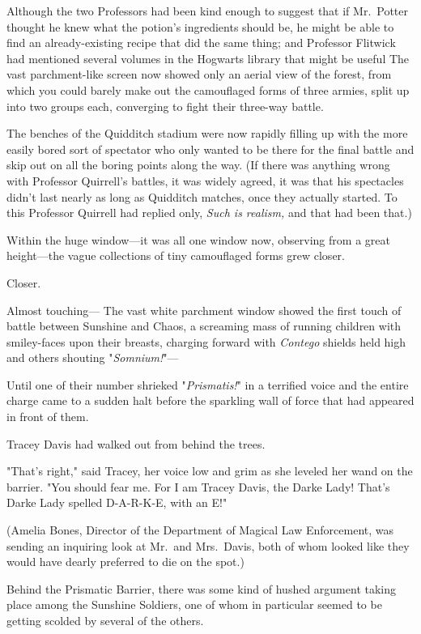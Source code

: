 Although the two Professors had been kind enough to suggest that if Mr.~Potter
thought he knew what the potion's ingredients should be, he might be able to
find an already-existing recipe that did the same thing; and Professor Flitwick
had mentioned several volumes in the Hogwarts library that might be
useful{\el}
\sbreak
The vast parchment-like screen now showed only an aerial view of the forest,
from which you could barely make out the camouflaged forms of three armies,
split up into two groups each, converging to fight their three-way battle.

The benches of the Quidditch stadium were now rapidly filling up with the more
easily bored sort of spectator who only wanted to be there for the final battle
and skip out on all the boring points along the way. (If there was anything
wrong with Professor Quirrell's battles, it was widely agreed, it was that his
spectacles didn't last nearly as long as Quidditch matches, once they actually
started. To this Professor Quirrell had replied only, \emph{Such is realism,}
and that had been that.)

Within the huge window---it was all one window now, observing from a great
height---the vague collections of tiny camouflaged forms grew closer.

Closer.

Almost touching---
\sbreak
The vast white parchment window showed the first touch of battle between
Sunshine and Chaos, a screaming mass of running children with smiley-faces upon
their breasts, charging forward with \emph{Contego} shields held high and
others shouting "\emph{Somnium!}"---

Until one of their number shrieked "\emph{Prismatis!}" in a terrified voice and
the entire charge came to a sudden halt before the sparkling wall of force that
had appeared in front of them.

Tracey Davis had walked out from behind the trees.

"That's right," said Tracey, her voice low and grim as she leveled her wand on
the barrier. "You should fear me. For I am Tracey Davis, the Darke Lady! That's
Darke Lady spelled D-A-R-K-E, with an E!"

(Amelia Bones, Director of the Department of Magical Law Enforcement, was
sending an inquiring look at Mr.~and Mrs.~Davis, both of whom looked like they
would have dearly preferred to die on the spot.)

Behind the Prismatic Barrier, there was some kind of hushed argument taking
place among the Sunshine Soldiers, one of whom in particular seemed to be
getting scolded by several of the others.

